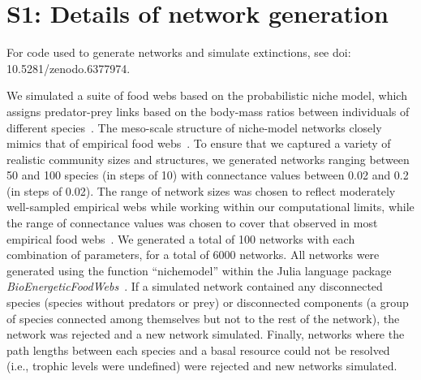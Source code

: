 \documentclass[12pt]{article}
\begin{document}
\clearpage

\section*{S1: Details of network generation}

    For code used to generate networks and simulate extinctions, see doi: 10.5281/zenodo.6377974.

	We simulated a suite of food webs based on the probabilistic niche model, which assigns predator-prey links based on the body-mass ratios between individuals of different species~\citep{Williams2000,Delmas2017}. The meso-scale structure of niche-model networks closely mimics that of empirical food webs~\citep{Stouffer2007}. To ensure that we captured a variety of realistic community sizes and structures, we generated networks ranging between 50 and 100 species (in steps of 10) with connectance values between 0.02 and 0.2 (in steps of 0.02). The range of network sizes was chosen to reflect moderately well-sampled empirical webs while working within our computational limits, while the range of connectance values was chosen to cover that observed in most empirical food webs~\citep{Dunne2002e}. We generated a total of 100 networks with each combination of parameters, for a total of 6000 networks. All networks were generated using the function ``nichemodel'' within the Julia language package \emph{BioEnergeticFoodWebs}~\citep{bioenergeticfw,Delmas2017}. If a simulated network contained any disconnected species (species without predators or prey) or disconnected components (a group of species connected among themselves but not to the rest of the network), the network was rejected and a new network simulated. Finally, networks where the path lengths between each species and a basal resource could not be resolved (i.e., trophic levels were undefined) were rejected and new networks simulated.
\end{document}
